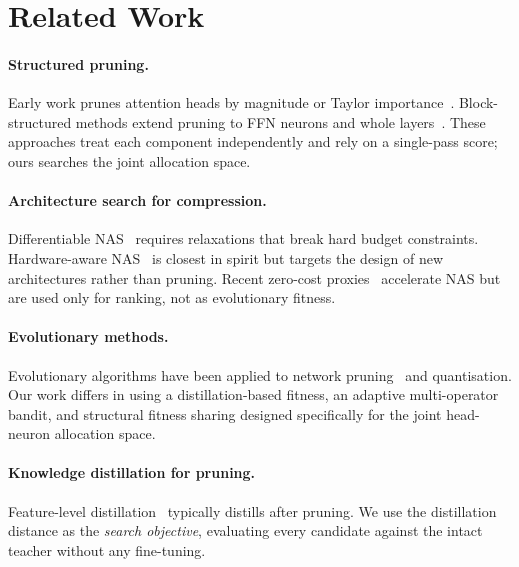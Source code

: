 \documentclass{article}
\begin{document}
\section{Related Work}
\label{sec:related}

\paragraph{Structured pruning.}
Early work prunes attention heads by magnitude or Taylor
importance~\citep{michel2019sixteen,voita2019analyzing,molchanov2019importance}.
Block-structured methods extend pruning to FFN neurons and whole
layers~\citep{xia2022structured,kwon2022fast}.  These approaches treat
each component independently and rely on a single-pass score; ours
searches the joint allocation space.

\paragraph{Architecture search for compression.}
Differentiable NAS~\citep{liu2019darts} requires relaxations that break
hard budget constraints.  Hardware-aware NAS~\citep{cai2019proxylessnas}
is closest in spirit but targets the design of new architectures rather
than pruning.  Recent zero-cost proxies~\citep{mellor2021neural,
chen2021neural} accelerate NAS but are used only for ranking, not as
evolutionary fitness.

\paragraph{Evolutionary methods.}
Evolutionary algorithms have been applied to network
pruning~\citep{liu2019metapruning,real2019regularized} and quantisation.
Our work differs in using a distillation-based fitness, an adaptive
multi-operator bandit, and structural fitness sharing designed
specifically for the joint head-neuron allocation space.

\paragraph{Knowledge distillation for pruning.}
Feature-level distillation~\citep{romero2014fitnets,
jiao2020tinybert,sun2020mobilebert} typically distills after
pruning.  We use the distillation distance as the \emph{search
objective}, evaluating every candidate against the intact teacher
without any fine-tuning.
\end{document}
